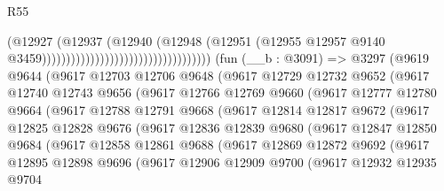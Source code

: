 \begin{lexlean}{R55}
\begin{coremodule}
                                                              (@12927
                                                                (@12937
                                                                  (@12940
                                                                    (@12948
                                                                      (@12951
                                                                        (@12955
                                                                          @12957
                                                                          @9140
                                                                          @3459)))))))))))))))))))))))))))))))))))
    (fun (__b : @3091) =>
    @3297
      (@9619
        @9644
        (@9617
          @12703
          @12706
          @9648
          (@9617
            @12729
            @12732
            @9652
            (@9617
              @12740
              @12743
              @9656
              (@9617
                @12766
                @12769
                @9660
                (@9617
                  @12777
                  @12780
                  @9664
                  (@9617
                    @12788
                    @12791
                    @9668
                    (@9617
                      @12814
                      @12817
                      @9672
                      (@9617
                        @12825
                        @12828
                        @9676
                        (@9617
                          @12836
                          @12839
                          @9680
                          (@9617
                            @12847
                            @12850
                            @9684
                            (@9617
                              @12858
                              @12861
                              @9688
                              (@9617
                                @12869
                                @12872
                                @9692
                                (@9617
                                  @12895
                                  @12898
                                  @9696
                                  (@9617
                                    @12906
                                    @12909
                                    @9700
                                    (@9617
                                      @12932
                                      @12935
                                      @9704

\end{coremodule}
\end{lexlean}
